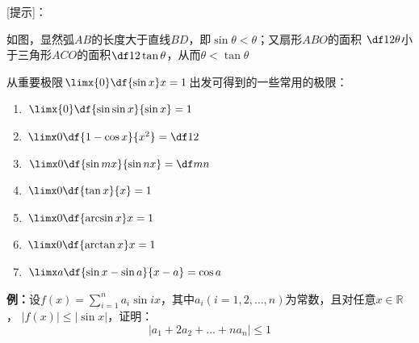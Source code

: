 [提示]：
\begin{center}
\end{center}

如图，显然弧$AB$的长度大于直线$BD$，即$\sin\theta<\theta$；又扇形$ABO$的面积
$\df12\theta$小于三角形$ACO$的面积$\df12\tan\theta$，从而$\theta<\tan\theta$

从重要极限$\limx{0}\df{\sin x}x=1$出发可得到的一些常用的极限：
\begin{thx}
	\begin{enumerate}[(1)]
	  \item $\limx{0}\df{\sin\sin x}{\sin x}=1$ 
	  \item $\limx 0\df{1-\cos x}{x^2}=\df12$ 
	  \item $\limx 0\df{\sin mx}{\sin nx}=\df mn$
	  \item $\limx 0\df{\tan x}{x}=1$
	  \item $\limx 0\df{\arcsin x}x=1$
	  \item $\limx 0\df{\arctan x}x=1$
	  \item $\limx a\df{\sin x-\sin a}{x-a}=\cos a$
	\end{enumerate}
\end{thx}

{\bf 例：}设$f(x)=\sum\limits_{i=1}^na_i\sin
ix$，其中$a_i(i=1,2,\ldots,n)$为常数，且对任意$x\in\mathbb{R}$， $|f(x)|\leq |\sin x|$，证明：
$$\left|a_1+2a_2+\ldots+na_n\right|\leq 1$$

